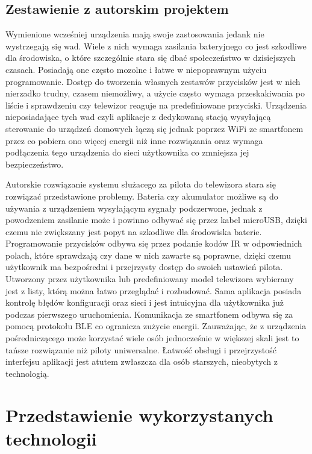 \documentclass[12pt,twoside]{article}
\begin{document}
\subsection{Zestawienie z autorskim projektem}
{Wymienione wcześniej urządzenia mają swoje zastosowania jedank nie wystrzegają się wad.
   Wiele z nich wymaga zasilania bateryjnego co jest szkodliwe dla środowiska, o które szczególnie
   stara się dbać społeczeństwo w dzisiejszych czasach. Posiadają one często mozolne i łatwe w niepoprawnym użyciu
   programowanie. Dostęp do tworzenia własnych
   zestawów przycisków jest w nich nierzadko trudny, czasem niemożliwy, a użycie często wymaga
   przeskakiwania po liście i sprawdzeniu czy telewizor reaguje na predefiniowane przyciski. Urządzenia nieposiadające tych wad czyli aplikacje z dedykowaną stacją wysyłającą sterowanie do urządzeń domowych łączą się jednak poprzez WiFi ze smartfonem przez co pobiera ono więcej energii niż inne rozwiązania oraz wymaga podłączenia tego urządzenia do sieci użytkownika co zmniejsza jej bezpieczeństwo.

   Autorskie rozwiązanie systemu służacego za pilota do telewizora stara się rozwiązać przedstawione problemy. Bateria czy akumulator możliwe
   są do używania z urządzeniem wysyłającym sygnały podczerwone, jednak z powodzeniem zasilanie może i powinno odbywać się przez
   kabel microUSB, dzięki czemu nie zwiększany jest popyt na szkodliwe dla środowiska baterie. Programowanie przycisków
   odbywa się przez podanie kodów IR w odpowiednich polach, które sprawdzają czy dane w nich zawarte są poprawne, dzięki czemu użytkownik ma bezpośredni i przejrzysty dostęp do swoich ustawień pilota. Utworzony przez użytkownika lub predefiniowany
   model telewizora wybierany jest z listy, którą można łatwo przeglądać i rozbudować. Sama aplikacja posiada kontrolę błędów konfiguracji oraz sieci
   i jest intuicyjna dla użytkownika już podczas pierwszego uruchomienia. Komunikacja ze smartfonem odbywa się za pomocą protokołu BLE co ogranicza zużycie energii. Zauważając, że z urządzenia pośredniczącego może korzystać wiele osób jednocześnie w większej skali jest to tańsze rozwiązanie niż piloty
   uniwersalne. Łatwość obsługi i przejrzystość interfejsu aplikacji jest atutem zwłaszcza dla osób starszych, nieobytych z technologią.
}
\clearpage
\section{Przedstawienie wykorzystanych technologii}
\end{document}
